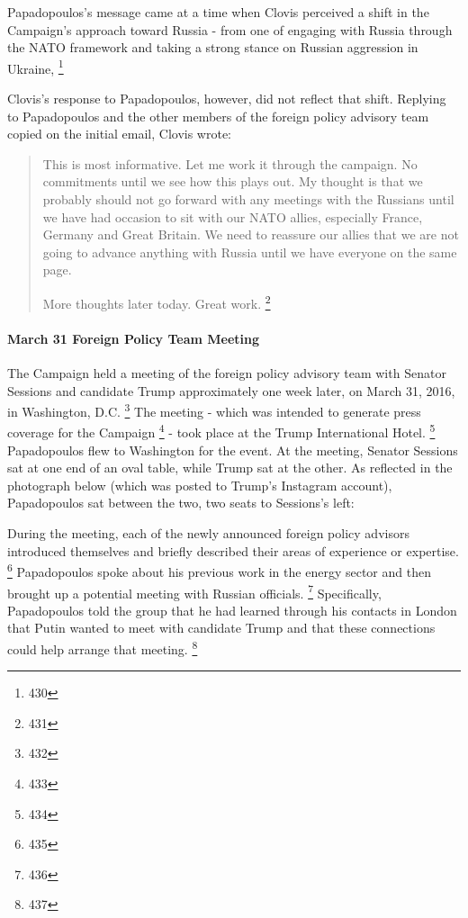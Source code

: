Papadopoulos's message came at a time when Clovis perceived a shift in the Campaign's approach toward Russia - from one of engaging with Russia through the NATO framework and taking a strong stance on Russian aggression in Ukraine, %
\footnote{430}

Clovis's response to Papadopoulos, however, did not reflect that shift.
Replying to Papadopoulos and the other members of the foreign policy advisory team copied on the initial email, Clovis wrote:

\begin{quote}
This is most informative.
Let me work it through the campaign.
No commitments until we see how this plays out.
My thought is that we probably should not go forward with any meetings with the Russians until we have had occasion to sit with our NATO allies, especially France, Germany and Great Britain.
We need to reassure our allies that we are not going to advance anything with Russia until we have everyone on the same page.

More thoughts later today.
Great work.%
\footnote{431}
\end{quote}

\paragraph{March 31 Foreign Policy Team Meeting}

The Campaign held a meeting of the foreign policy advisory team with Senator Sessions and candidate Trump approximately one week later, on March 31, 2016, in Washington, D.C.%
\footnote{432}
The meeting - which was intended to generate press coverage for the Campaign%
\footnote{433}
- took place at the Trump International Hotel.%
\footnote{434}
Papadopoulos flew to Washington for the event.
At the meeting, Senator Sessions sat at one end of an oval table, while Trump sat at the other.
As reflected in the photograph below (which was posted to Trump's Instagram account), Papadopoulos sat between the two, two seats to Sessions's left:


During the meeting, each of the newly announced foreign policy advisors introduced themselves and briefly described their areas of experience or expertise.%
\footnote{435}
Papadopoulos spoke about his previous work in the energy sector and then brought up a potential meeting with Russian officials.%
\footnote{436}
Specifically, Papadopoulos told the group that he had learned through his contacts in London that Putin wanted to meet with candidate Trump and that these connections could help arrange that meeting.%
\footnote{437}

